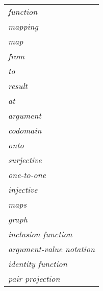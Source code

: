 { \tiny
\begin{tabular}{l}

\textit{function}
\\

\textit{mapping}
\\

\textit{map}
\\

\textit{from}
\\

\textit{to}
\\

\textit{result}
\\

\textit{at}
\\

\textit{argument}
\\

\textit{codomain}
\\

\textit{onto}
\\

\textit{surjective}
\\

\textit{one-to-one}
\\

\textit{injective}
\\

\textit{maps}
\\

\textit{graph}
\\

\textit{inclusion function}
\\

\textit{argument-value notation}
\\

\textit{identity function}
\\

\textit{pair projection}
\\

\end{tabular}
}


\clearpage{}

\newpage
\label{function_restrictions_and_extensions}
\label{sheets:function_restrictions_and_extensions}
\hypertarget{function_restrictions_and_extensions}{}


\clearpage



